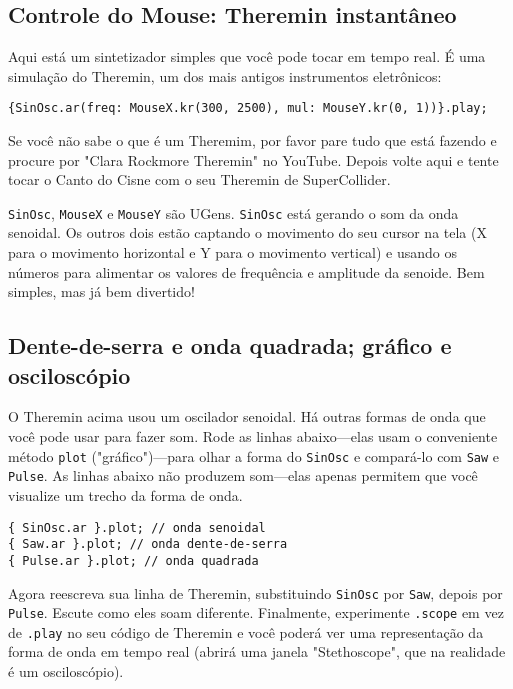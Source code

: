 \subsection{Controle do Mouse: Theremin instantâneo}

Aqui está um sintetizador simples que você pode tocar em tempo real. É uma simulação do Theremin, um dos mais antigos instrumentos eletrônicos:

\begin{lstlisting}[style=SuperCollider-IDE, basicstyle=\scttfamily\footnotesize]
{SinOsc.ar(freq: MouseX.kr(300, 2500), mul: MouseY.kr(0, 1))}.play;
\end{lstlisting}

Se você não sabe o que é um Theremim, por favor pare tudo que está fazendo e procure por "Clara Rockmore Theremin" no YouTube. Depois volte aqui e tente tocar o Canto do Cisne com o seu Theremin de SuperCollider.

\texttt{SinOsc}, \texttt{MouseX} e \texttt{MouseY} são UGens. \texttt{SinOsc} está gerando o som da onda senoidal. Os outros dois estão captando o movimento do seu cursor na tela (X para o movimento horizontal e Y para o movimento vertical) e usando os números para alimentar os valores de frequência e amplitude da senoide. Bem simples, mas já bem divertido!

\subsection{Dente-de-serra e onda quadrada; gráfico e osciloscópio}

O Theremin acima usou um oscilador senoidal. Há outras formas de onda que você pode usar para fazer som. Rode as linhas abaixo---elas usam o conveniente método \texttt{plot} ("gráfico")---para olhar a forma do \texttt{SinOsc} e compará-lo com \texttt{Saw} e \texttt{Pulse}. As linhas abaixo não produzem som---elas apenas permitem que você visualize um trecho da forma de onda.

\begin{lstlisting}[style=SuperCollider-IDE, basicstyle=\scttfamily\footnotesize]
{ SinOsc.ar }.plot; // onda senoidal
{ Saw.ar }.plot; // onda dente-de-serra
{ Pulse.ar }.plot; // onda quadrada
\end{lstlisting}

Agora reescreva sua linha de Theremin, substituindo \texttt{SinOsc} por \texttt{Saw}, depois por \texttt{Pulse}. Escute como eles soam diferente. Finalmente, experimente \texttt{.scope} em vez de \texttt{.play} no seu código de Theremin e você poderá ver uma representação da forma de onda em tempo real (abrirá uma janela "Stethoscope", que na realidade é um osciloscópio).
